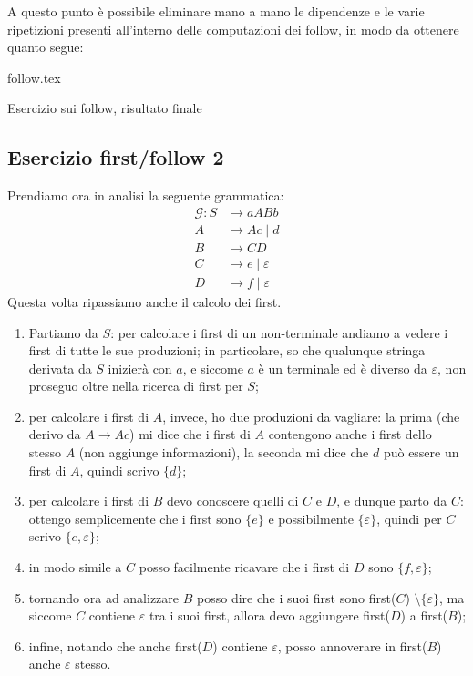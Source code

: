 \documentclass[class=book, crop=false, oneside, 12pt]{standalone}
\begin{document}
A questo punto è possibile eliminare mano a mano le dipendenze e le varie ripetizioni presenti all'interno delle computazioni dei follow, in modo da ottenere quanto segue: 

\begin{table}[H]
	\centering
	{follow.tex}
    \caption{Esercizio sui follow, risultato finale}
    \label{follow}
\end{table}

\subsection{Esercizio first/follow 2}
\label{first-folllow-ex-2}
Prendiamo ora in analisi la seguente grammatica:
\begin{align*}
       \mathcal{G}: S &\to aABb \\
       A &\to Ac \mid d \\
       B &\to CD \\
       C &\to e \mid \varepsilon \\
       D &\to f \mid \varepsilon
\end{align*}
Questa volta ripassiamo anche il calcolo dei first.
\begin{enumerate}
    \item Partiamo da \(S\): per calcolare i first di un non-terminale andiamo a vedere i first di tutte le sue produzioni; in particolare, so che qualunque stringa derivata da \(S\) inizierà con \(a\), e siccome \(a\) è un terminale ed è diverso da \(\varepsilon\), non proseguo oltre nella ricerca di first per \(S\);
    \item per calcolare i first di \(A\), invece, ho due produzioni da vagliare: la prima (che derivo da \(A \to Ac\)) mi dice che i first di \(A\) contengono anche i first dello stesso \(A\) (non aggiunge informazioni), la seconda mi dice che \(d\) può essere un first di \(A\), quindi scrivo \(\{d\}\);
    \item per calcolare i first di \(B\) devo conoscere quelli di \(C\) e \(D\), e dunque parto da \(C\): ottengo semplicemente che i first sono \(\{e\}\) e possibilmente \(\{\varepsilon\}\), quindi per \(C\) scrivo \(\{e, \varepsilon\}\);
    \item in modo simile a \(C\) posso facilmente ricavare che i first di \(D\) sono \(\{f, \varepsilon\}\);
    \item tornando ora ad analizzare \(B\) posso dire che i suoi first sono first(\(C\)) \( \setminus \{\varepsilon\}\), ma siccome \(C\) contiene \(\varepsilon\) tra i suoi first, allora devo aggiungere first(\(D\)) a first(\(B\));
    \item infine, notando che anche first(\(D\)) contiene \(\varepsilon\), posso annoverare in first(\(B\)) anche \(\varepsilon\) stesso.    
\end{enumerate}
\end{document}
